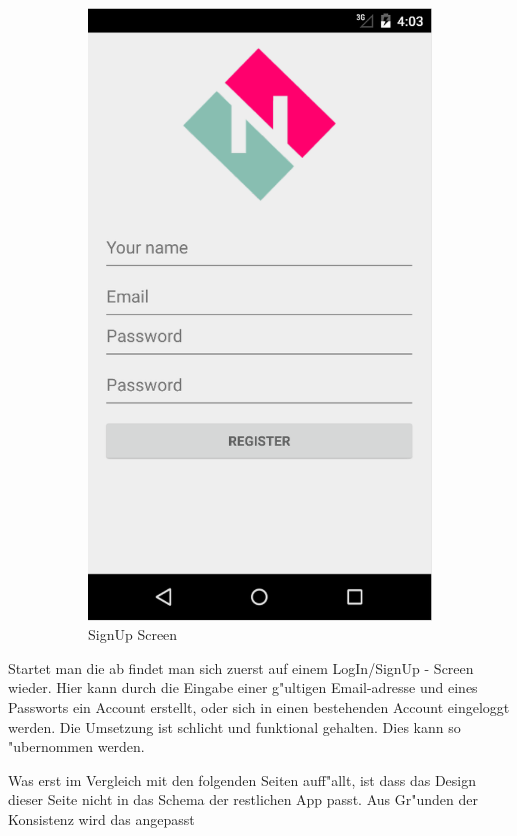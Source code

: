 \begin{figure}[h]
\begin{subfigure}{0.5\textwidth}
\includegraphics[width=0.9\linewidth]{./Bilder/signUp.png}
\caption{SignUp Screen}
\label{fig:signin}
\end{subfigure}
\caption{}
\label{fig:image2}
\end{figure}

 Startet man die ab findet man sich zuerst auf einem LogIn/SignUp - Screen wieder. 
 Hier kann durch die Eingabe einer g"ultigen Email-adresse und eines Passworts ein Account erstellt, oder sich in einen bestehenden Account eingeloggt werden. 
 Die Umsetzung ist schlicht und funktional gehalten. 
 Dies kann so "ubernommen werden. 
 
 Was erst im Vergleich mit den folgenden Seiten auff"allt, ist dass das Design dieser Seite nicht in das Schema der restlichen App passt. 
 Aus Gr"unden der Konsistenz wird das angepasst 
  
